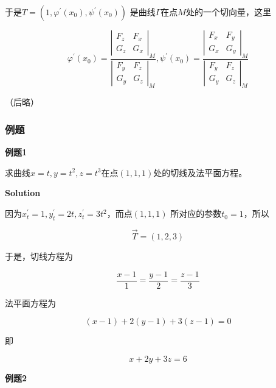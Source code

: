 \documentclass[12pt, a4paper]{article}
\numberwithin{equation}{section}
\begin{document}
    于是$T=\left(1, \varphi^{\prime}\left(x_0\right), \psi^{\prime}\left(x_0\right)\right)$
    是曲线\(\varGamma\)在点\(M\)处的一个切向量，这里

    $$
        \varphi^{\prime}\left(x_0\right)=\frac{\left|\begin{array}{ll}
        F_z & F_x \\
        G_z & G_x
        \end{array}\right|_M}{\left|\begin{array}{ll}
        F_y & F_z \\
        G_y & G_z
        \end{array}\right|_M}, \psi^{\prime}\left(x_0\right)=\frac{\left|\begin{array}{ll}
        F_x & F_y \\
        G_x & G_y
        \end{array}\right|_M}{\left|\begin{array}{ll}
        F_y & F_z \\
        G_y & G_z
        \end{array}\right|_M}
    $$

    （后略）

\subsubsection{例题}

    \textbf{例题1}

    求曲线$x=t, y=t^2, z=t^3$在点\(\left(1,1,1\right)\)处的切线及法平面方程。
    \vspace{1em}

    \textbf{Solution}
    \vspace{1em}

    因为$x_t^{\prime}=1, y_t^{\prime}=2 t, z_t^{\prime}=3 t^2$，而点\(\left(1,1,1\right)\)
    所对应的参数\(t_0=1\)，所以

    \[
        \overrightarrow{T} = \left(1,2,3\right)
    \]

    于是，切线方程为

    $$
        \frac{x-1}{1}=\frac{y-1}{2}=\frac{z-1}{3}
    $$

    法平面方程为

    $$
        (x-1)+2(y-1)+3(z-1)=0
    $$

    即

    $$
        x+2 y+3 z=6
    $$

    \vspace{1em}
    \textbf{例题2}
\end{document}
